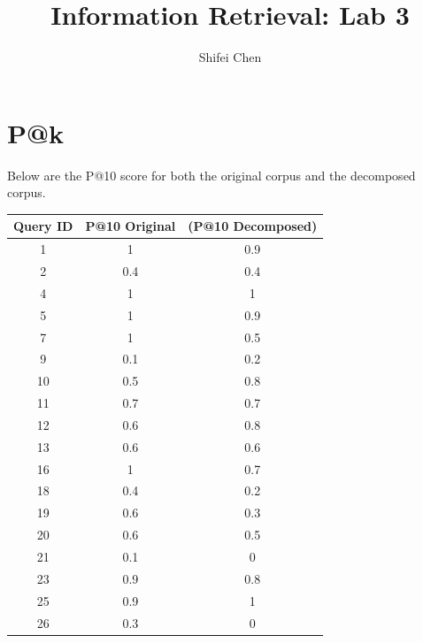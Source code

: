 \documentclass[11pt]{article} %
\title{{\LARGE Information Retrieval: Lab 3}\\[1.5mm]} %
\author{Shifei Chen} %
\begin{document}
\maketitle

\section{P@k}

Below are the P@10 score for both the original corpus and the decomposed corpus.

\begin{table}[h]
    \begin{center}
        \begin{tabular}{c|c|c|}
            \textbf{Query ID} & \textbf{P@10 Original} & \textbf(P@10 Decomposed) \\
            \hline
            1   & 1                 & 0.9               \\
            2   & 0.4               & 0.4               \\
            4   & 1                 & 1                 \\
            5   & 1                 & 0.9               \\
            7   & 1                 & 0.5               \\
            9   & 0.1               & 0.2               \\
            10  & 0.5               & 0.8               \\
            11  & 0.7               & 0.7               \\
            12  & 0.6               & 0.8               \\
            13  & 0.6               & 0.6               \\
            16  & 1                 & 0.7               \\
            18  & 0.4               & 0.2               \\
            19  & 0.6               & 0.3               \\
            20  & 0.6               & 0.5               \\
            21  & 0.1               & 0                 \\
            23  & 0.9               & 0.8               \\
            25  & 0.9               & 1                 \\
            26  & 0.3               & 0                 \\

\end{tabular}
\end{center}
\end{table}
\end{document}
